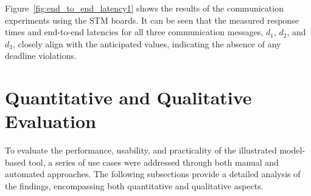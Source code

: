 


    Figure~\ref{fig:end_to_end_latency1} shows the results of the communication experiments using the STM boards. It can be seen that the measured response times and end-to-end latencies for all three communication messages, $d_1$, $d_2$, and $d_3$, closely align with the anticipated values, indicating the absence of any deadline violations.




    \section{Quantitative and Qualitative Evaluation}\label{qualTime}

    To evaluate the performance, usability, and practicality of the illustrated model-based tool, a series of use cases were addressed through both manual and automated approaches. The following subsections provide a detailed analysis of the findings, encompassing both quantitative and qualitative aspects.









